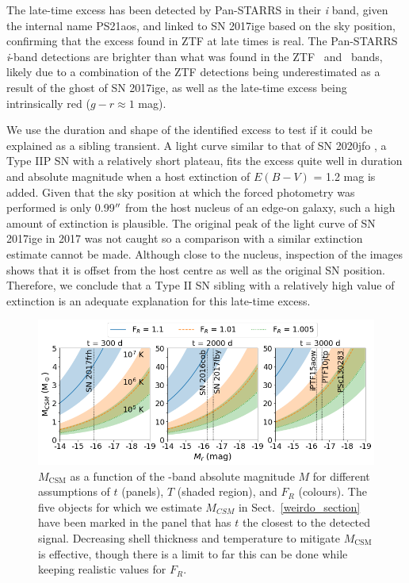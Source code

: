 \documentclass[a4paper,oneside,12pt, class=Latex/Classes/PhDthesisPSnPDF, crop=false]{standalone}
\begin{document}
The late-time excess has been detected by Pan-STARRS in their \textit{i} band, given the internal name PS21aos, and linked to SN 2017ige based on the sky position, confirming that the excess found in ZTF at late times is real. The Pan-STARRS \textit{i}-band detections are brighter than what was found in the ZTF \ztfg~and \ztfr~bands, likely due to a combination of the ZTF detections being underestimated as a result of the ghost of SN 2017ige, as well as the late-time excess being intrinsically red ($g - r \approx 1$ mag). 

We use the duration and shape of the identified excess to test if it could be explained as a sibling transient. A light curve similar to that of SN 2020jfo \citep{Sollerman_2020jfo, IIp_ext}, a Type IIP SN with a relatively short plateau, fits the excess quite well in duration and absolute magnitude when a host extinction of $ E(B - V)$ = 1.2 mag is added. Given that the sky position at which the forced photometry was performed is only 0.99$^{\prime\prime}$ from the host nucleus of an edge-on galaxy, such a high amount of extinction is plausible. The original peak of the light curve of SN 2017ige in 2017 was not caught so a comparison with a similar extinction estimate cannot be made. Although close to the nucleus, inspection of the images shows that it is offset from the host centre as well as the original SN position. Therefore, we conclude that a Type II SN sibling with a relatively high value of extinction is an adequate explanation for this late-time excess.\\


\begin{figure}
    \centering
    \includegraphics[width=16cm]{../Images/chapter_4/M_MCSM_rel.png}
    \caption{$M_\text{CSM}$ as a function of the \ztfr-band absolute magnitude $M$ for different assumptions of $t$ (panels), $T$ (shaded region), and $F_R$ (colours). The five objects for which we estimate $M_{CSM}$ in Sect.~\ref{weirdo_section} have been marked in the panel that has $t$ the closest to the detected signal. Decreasing shell thickness and temperature to mitigate $M_\text{CSM}$ is effective, though there is a limit to far this can be done while keeping realistic values for $F_R$.}
    \label{M_CMS_fig}
\end{figure}
\end{document}
